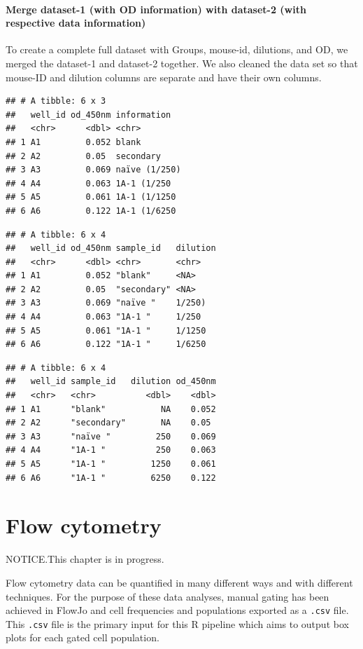 \documentclass[
]{book}
\begin{document}
\subsubsection{Merge dataset-1 (with OD information) with dataset-2 (with respective data information)}\label{merge-dataset-1-with-od-information-with-dataset-2-with-respective-data-information}

To create a complete full dataset with Groups, mouse-id, dilutions, and OD, we merged the dataset-1 and dataset-2 together. We also cleaned the data set so that mouse-ID and dilution columns are separate and have their own columns.

\begin{verbatim}
## # A tibble: 6 x 3
##   well_id od_450nm information  
##   <chr>      <dbl> <chr>        
## 1 A1         0.052 blank        
## 2 A2         0.05  secondary    
## 3 A3         0.069 naïve (1/250)
## 4 A4         0.063 1A-1 (1/250  
## 5 A5         0.061 1A-1 (1/1250 
## 6 A6         0.122 1A-1 (1/6250
\end{verbatim}

\begin{verbatim}
## # A tibble: 6 x 4
##   well_id od_450nm sample_id   dilution
##   <chr>      <dbl> <chr>       <chr>   
## 1 A1         0.052 "blank"     <NA>    
## 2 A2         0.05  "secondary" <NA>    
## 3 A3         0.069 "naïve "    1/250)  
## 4 A4         0.063 "1A-1 "     1/250   
## 5 A5         0.061 "1A-1 "     1/1250  
## 6 A6         0.122 "1A-1 "     1/6250
\end{verbatim}

\begin{verbatim}
## # A tibble: 6 x 4
##   well_id sample_id   dilution od_450nm
##   <chr>   <chr>          <dbl>    <dbl>
## 1 A1      "blank"           NA    0.052
## 2 A2      "secondary"       NA    0.05 
## 3 A3      "naïve "         250    0.069
## 4 A4      "1A-1 "          250    0.063
## 5 A5      "1A-1 "         1250    0.061
## 6 A6      "1A-1 "         6250    0.122
\end{verbatim}

\chapter{Flow cytometry}\label{flow-cytometry}

NOTICE.This chapter is
in progress.

Flow cytometry data can be quantified in many different ways and with different techniques. For the purpose of these data analyses, manual gating has been achieved in FlowJo and cell frequencies and populations exported as a \texttt{.csv} file. This \texttt{.csv} file is the primary input for this R pipeline which aims to output box plots for each gated cell population.
\end{document}
